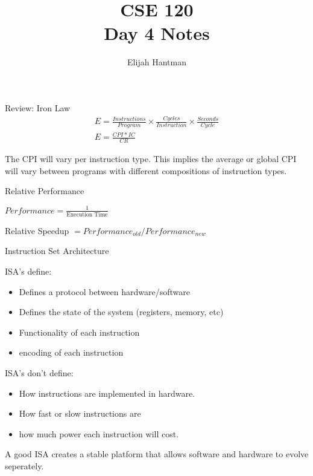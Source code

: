\documentclass{report}
\title{\Huge{CSE 120}\\Day 4 Notes}
\author{\huge{Elijah Hantman}}
\date{}
\begin{document}
\maketitle
\newpage

\begin{description}
    \item Review: Iron Law
        \begin{gather}
            E = \frac{Instructions}{Program} \times \frac{Cycles}{Instruction} \times \frac{Seconds}{Cycle}\\
            E = \frac{CPI * IC}{CR}
        \end{gather}

        \begin{mdframed}
            The CPI will vary per instruction type. This implies the average or global CPI
            will vary between programs with different compositions of instruction types.
        \end{mdframed}

    \item Relative Performance

        $Performance = \frac{1}{\textrm{Execution Time}}$

        Relative Speedup $= Performance_{old} / Performance_{new}$

    \item Instruction Set Architecture

        ISA's define:
        \begin{itemize}
            \item Defines a protocol between hardware/software
            \item Defines the state of the system (registers, memory, etc)
            \item Functionality of each instruction
            \item encoding of each instruction
        \end{itemize}

        ISA's don't define:
        \begin{itemize}
            \item How instructions are implemented in hardware.
            \item How fast or slow instructions are
            \item how much power each instruction will cost.
        \end{itemize}

        A good ISA creates a stable platform that allows software and hardware
        to evolve seperately.


\end{description}
\end{document}
